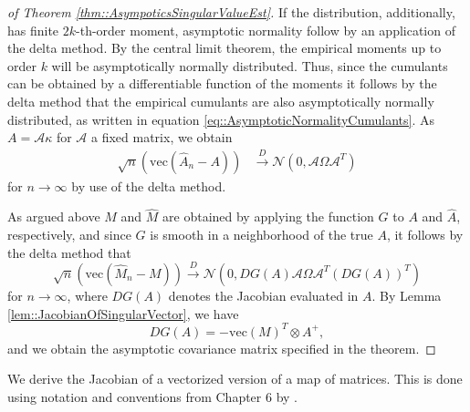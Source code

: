 \documentclass{biometrika}
\begin{document}
\begin{proof}[ of Theorem \ref{thm::AsympoticsSingularValueEst}]
If the distribution, additionally, has finite $2k$-th-order moment, asymptotic normality follow by an application of the delta method. By the central limit theorem, the empirical moments up to order $k$ will be asymptotically normally distributed. Thus, since the cumulants can be obtained by a differentiable function of the moments it follows by the delta method that the empirical cumulants are also asymptotically normally distributed, as written in equation \eqref{eq::AsymptoticNormalityCumulants}. As $A = \mathcal{A} \kappa$ for $\mathcal{A}$ a fixed matrix, we obtain
\begin{align*}
    \sqrt{n}(\mathrm{vec}(\hat{A}_n - A)) & \xrightarrow{D} \mathcal{N} \left(0, \mathcal{A} \Omega \mathcal{A}^T \right)
\end{align*}
for $n \rightarrow \infty$ by use of the delta method. 

As argued above $M$ and $\hat{M}$ are obtained by applying the function $G$ to $A$ and $\hat{A}$, 
respectively, and since $G$ is smooth in a neighborhood of the true $A$, it follows by the delta method that 
$$
\sqrt{n}(\mathrm{vec}(\hat{M}_n - M))  \xrightarrow{D} \mathcal{N} \left(0,  D G (A)  \mathcal{A}  \Omega  \mathcal{A}^T (DG(A))^T  \right)
$$
for $n \rightarrow \infty$, where $DG(A)$ denotes the Jacobian evaluated in $A$. By Lemma \ref{lem::JacobianOfSingularVector}, we have 
$$
    DG(A) = - \mathrm{vec}(M)^T \otimes A^{+},
$$
and we obtain the asymptotic covariance matrix specified in the theorem. 
\end{proof}


We derive the Jacobian of a vectorized version of a map of matrices. This is done using notation and conventions from Chapter 6 by \cite{magnus_neudecker_2019}.
\end{document}
